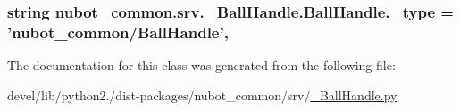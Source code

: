 \hypertarget{classnubot__common_1_1srv_1_1__BallHandle_1_1BallHandle_a6d0b7cb7054baf22ce4e0bc9192e0119}{
\subsubsection[{\-\_\-type}]{\setlength{\rightskip}{0pt plus 5cm}string nubot\-\_\-common.\-srv.\-\_\-\-Ball\-Handle.\-Ball\-Handle.\-\_\-type = 'nubot\-\_\-common/{\bf Ball\-Handle}'\hspace{0.3cm}{\ttfamily [static]}, {\ttfamily [private]}}}\label{classnubot__common_1_1srv_1_1__BallHandle_1_1BallHandle_a6d0b7cb7054baf22ce4e0bc9192e0119}


The documentation for this class was generated from the following file\-:\begin{DoxyCompactItemize}
\item 
devel/lib/python2./dist-\/packages/nubot\-\_\-common/srv/\hyperlink{__BallHandle_8py}{\-\_\-\-Ball\-Handle.\-py}\end{DoxyCompactItemize}
